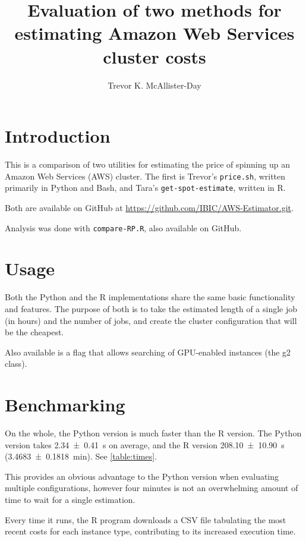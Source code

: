 \documentclass[11pt]{article}
\title{Evaluation of two methods for estimating Amazon Web Services cluster costs}
\author{Trevor K. McAllister-Day}
\begin{document}
	
	\maketitle
	
	\begin{multicols}{2}
		
		\section{Introduction}
		
		This is a comparison of two utilities for estimating the price of spinning up an Amazon Web Services (AWS) cluster. The first is Trevor's \texttt{price.sh}, written primarily in Python and Bash, and Tara's \texttt{get-spot-estimate}, written in R.
		
		Both are available on GitHub at \url{https://github.com/IBIC/AWS-Estimator.git}.
		
		Analysis was done with \texttt{compare-RP.R}, also available on GitHub.
		
		\section{Usage}
		
		Both the Python and the R implementations share the same basic functionality and features. The purpose of both is to take the estimated length of a single job (in hours) and the number of jobs, and create the cluster configuration that will be the cheapest. 
		
		Also available is a flag that allows searching of GPU-enabled instances (the g2 class).
		
		\section{Benchmarking}
		
		On the whole, the Python version is much faster than the R version. The Python version takes \SI{2.34\pm0.41}{\second} on average, and the R version \SI{208.10\pm10.90}{\second} (\SI{3.4683\pm0.1818}{\minute}). See \autoref{table:times}.		
		
		This provides an obvious advantage to the Python version when evaluating multiple configurations, however four minutes is not an overwhelming amount of time to wait for a single estimation.
		
		Every time it runs, the R program downloads a CSV file tabulating the most recent costs for each instance type, contributing to its increased execution time. 
		
	\end{multicols}
	
\end{document}
